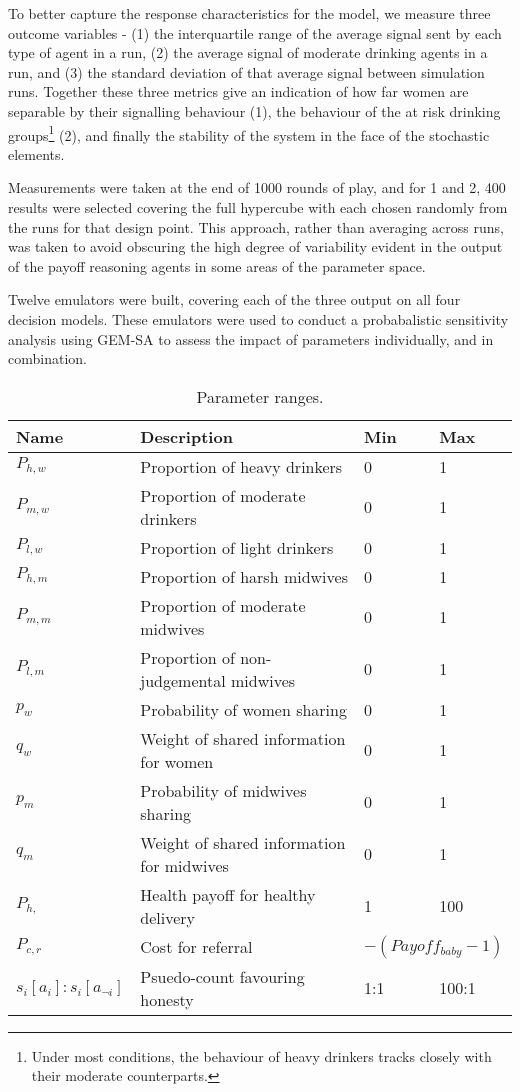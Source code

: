 To better capture the response characteristics for the model, we measure three outcome variables - (1) the interquartile range of the average signal sent by each type of agent in a run, (2) the average signal of moderate drinking agents in a run, and (3) the standard deviation of that average signal between simulation runs. Together these three metrics give an indication of how far women are separable by their signalling behaviour (1), the behaviour of the at risk drinking groups\footnote{Under most conditions, the behaviour of heavy drinkers tracks closely with their moderate counterparts.} (2), and finally the stability of the system in the face of the stochastic elements.

Measurements were taken at the end of 1000 rounds of play, and for 1 and 2, 400 results were selected covering the full hypercube with each chosen randomly from the runs for that design point. This approach, rather than averaging across runs, was taken to avoid obscuring the high degree of variability evident in the output of the payoff reasoning agents in some areas of the parameter space.

Twelve emulators were built, covering each of the three output on all four decision models. These emulators were used to conduct a probabalistic sensitivity analysis using \ac{GEM-SA} to assess the impact of parameters individually, and in combination.

\begin{table}
\center
\begin{tabular} {|l | l | l| l|}
\hline
Name & Description & Min & Max \\ \hline
\(P_{h,w}\) & Proportion of heavy drinkers & 0 & 1 \\ \hline
\(P_{m,w}\) & Proportion of moderate drinkers & 0 & 1 \\ \hline
\(P_{l,w}\) & Proportion of light drinkers & 0 & 1 \\ \hline
\(P_{h,m}\) & Proportion of harsh midwives & 0 & 1 \\ \hline
\(P_{m,m}\) & Proportion of moderate midwives & 0 & 1 \\ \hline
\(P_{l,m}\) & Proportion of non-judgemental midwives & 0 & 1 \\ \hline
\(p_{w}\) & Probability of women sharing & 0 & 1 \\ \hline
\(q_{w}\) & Weight of shared information for women & 0 & 1 \\ \hline
\(p_{m}\) & Probability of midwives sharing & 0 & 1 \\ \hline
\(q_{m}\) & Weight of shared information for midwives & 0 & 1 \\ \hline
\(P_{h,}\) & Health payoff for healthy delivery & 1 & 100 \\ \hline
\(P_{c, r}\) & Cost for referral & \multicolumn{2}{l|}{\(-(Payoff_{baby} - 1)\)} \\ \hline
\(s_{i}[a_{i}]:s_{i}[a_{\neg i}]\) & Psuedo-count favouring honesty & 1:1 & 100:1 \\ \hline
\end{tabular}
\caption[Table caption text]{Parameter ranges. \label{tab:sa_params}}
\end{table}

